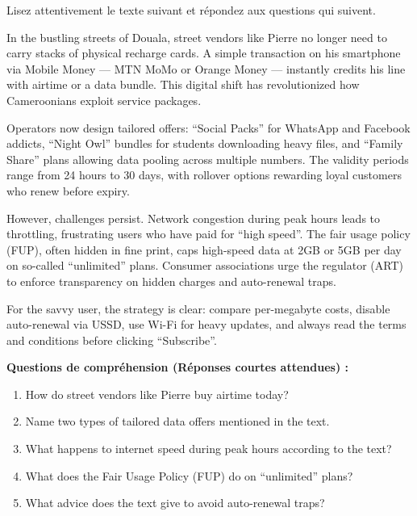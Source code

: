 \documentclass[11pt]{article}
\newcommand{\cle}[1]{{\popxbold\color{popdark}#1}}
\begin{document}
\begin{exercice}
Lisez attentivement le texte suivant et répondez aux questions qui suivent.

\begin{textebox}
In the bustling streets of Douala, street vendors like Pierre no longer need to carry stacks of physical recharge cards. A simple transaction on his smartphone via Mobile Money — MTN MoMo or Orange Money — instantly credits his line with airtime or a data bundle. This digital shift has revolutionized how Cameroonians \cle{exploit} service packages.

Operators now design \cle{tailored} offers: “Social Packs” for WhatsApp and Facebook addicts, “Night Owl” bundles for students downloading heavy files, and “Family Share” plans allowing data \cle{pooling} across multiple numbers. The \cle{validity} periods range from 24 hours to 30 days, with \cle{rollover} options rewarding loyal customers who renew before \cle{expiry}.

However, challenges persist. \cle{Network congestion} during peak hours leads to \cle{throttling}, frustrating users who have paid for “high speed”. The \cle{fair usage policy} (FUP), often hidden in fine print, caps high-speed data at 2GB or 5GB per day on so-called “unlimited” plans. Consumer associations urge the \cle{regulator} (ART) to enforce transparency on \cle{hidden charges} and \cle{auto-renewal} traps.

For the savvy user, the strategy is clear: compare \cle{per-megabyte} costs, disable auto-renewal via USSD, use Wi-Fi for heavy updates, and always read the \cle{terms and conditions} before clicking “Subscribe”.
\end{textebox}

\textbf{Questions de compréhension (Réponses courtes attendues) :}
\begin{enumerate}
    \item How do street vendors like Pierre buy airtime today?
    \item Name two types of tailored data offers mentioned in the text.
    \item What happens to internet speed during peak hours according to the text?
    \item What does the Fair Usage Policy (FUP) do on “unlimited” plans?
    \item What advice does the text give to avoid auto-renewal traps?
\end{enumerate}


\end{exercice}
\end{document}

